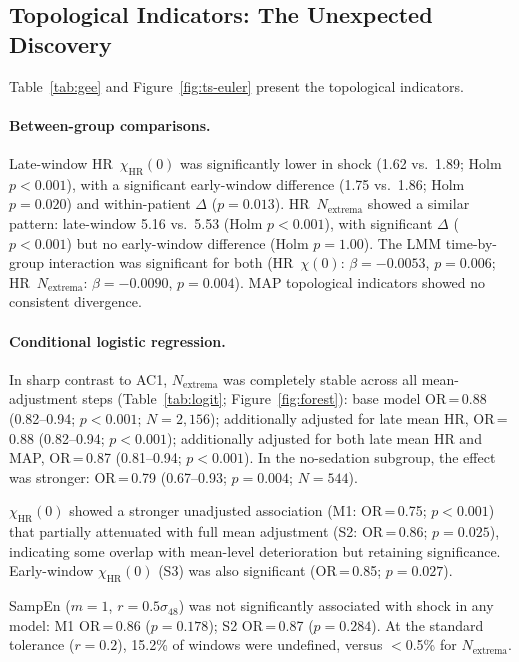 \documentclass[12pt,a4paper]{article}
\begin{document}
\subsection{Topological Indicators: The Unexpected Discovery}
\label{sec:euler-results}

Table~\ref{tab:gee} and Figure~\ref{fig:ts-euler} present the
topological indicators.

\paragraph{Between-group comparisons.}
Late-window HR~$\chi_{\text{HR}}(0)$ was significantly lower in shock
(1.62 vs.\ 1.89; Holm $p<0.001$), with a significant early-window difference
(1.75 vs.\ 1.86; Holm $p=0.020$) and within-patient $\Delta$ ($p=0.013$).
HR~$N_{\text{extrema}}$ showed a similar pattern: late-window 5.16 vs.\ 5.53
(Holm $p<0.001$), with significant $\Delta$ ($p<0.001$) but no early-window
difference (Holm $p=1.00$).
The LMM time-by-group interaction was significant for both
(HR~$\chi(0)$: $\beta=-0.0053$, $p=0.006$;
HR~$N_{\text{extrema}}$: $\beta=-0.0090$, $p=0.004$).
MAP topological indicators showed no consistent divergence.

\paragraph{Conditional logistic regression.}
In sharp contrast to AC1, $N_{\text{extrema}}$ was completely stable
across all mean-adjustment steps (Table~\ref{tab:logit};
Figure~\ref{fig:forest}):
base model OR\,=\,0.88 (0.82--0.94; $p<0.001$; $N=2{,}156$);
additionally adjusted for late mean HR, OR\,=\,0.88 (0.82--0.94; $p<0.001$);
additionally adjusted for both late mean HR and MAP,
OR\,=\,0.87 (0.81--0.94; $p<0.001$).
In the no-sedation subgroup, the effect was stronger:
OR\,=\,0.79 (0.67--0.93; $p=0.004$; $N=544$).

$\chi_{\text{HR}}(0)$ showed a stronger unadjusted association
(M1: OR\,=\,0.75; $p<0.001$) that partially attenuated with full mean
adjustment (S2: OR\,=\,0.86; $p=0.025$), indicating some overlap with
mean-level deterioration but retaining significance.
Early-window $\chi_{\text{HR}}(0)$ (S3) was also significant
(OR\,=\,0.85; $p=0.027$).

SampEn ($m=1$, $r=0.5\sigma_{48}$) was not significantly associated with
shock in any model: M1 OR\,=\,0.86 ($p=0.178$); S2 OR\,=\,0.87 ($p=0.284$).
At the standard tolerance ($r=0.2$), 15.2\% of windows were undefined,
versus $<$0.5\% for $N_{\text{extrema}}$.
\end{document}
